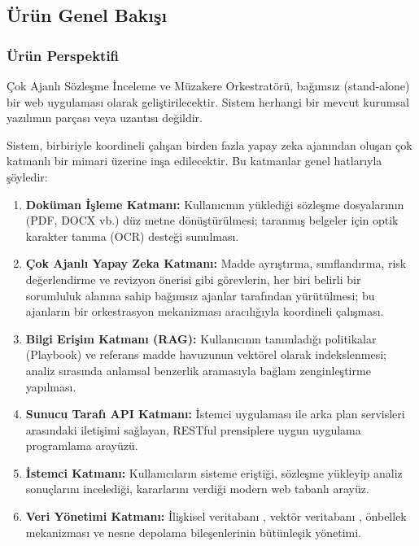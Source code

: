 \documentclass[12pt, a4paper]{article}
\begin{document}
\subsection{Ürün Genel Bakışı}

\subsubsection{Ürün Perspektifi}
Çok Ajanlı Sözleşme İnceleme ve Müzakere Orkestratörü, bağımsız (stand-alone) bir web uygulaması olarak geliştirilecektir. Sistem herhangi bir mevcut kurumsal yazılımın parçası veya uzantısı değildir.

Sistem, birbiriyle koordineli çalışan birden fazla yapay zeka ajanından oluşan çok katmanlı bir mimari üzerine inşa edilecektir. Bu katmanlar genel hatlarıyla şöyledir:

\begin{enumerate}[leftmargin=2cm]
    \item \textbf{Doküman İşleme Katmanı:} Kullanıcının yüklediği sözleşme dosyalarının (PDF, DOCX vb.) düz metne dönüştürülmesi; taranmış belgeler için optik karakter tanıma (OCR) desteği sunulması.
    \item \textbf{Çok Ajanlı Yapay Zeka Katmanı:} Madde ayrıştırma, sınıflandırma, risk değerlendirme ve revizyon önerisi gibi görevlerin, her biri belirli bir sorumluluk alanına sahip bağımsız ajanlar tarafından yürütülmesi; bu ajanların bir orkestrasyon mekanizması aracılığıyla koordineli çalışması.
    \item \textbf{Bilgi Erişim Katmanı (RAG):} Kullanıcının tanımladığı politikalar (Playbook) ve referans madde havuzunun vektörel olarak indekslenmesi; analiz sırasında anlamsal benzerlik aramasıyla bağlam zenginleştirme yapılması.
    \item \textbf{Sunucu Tarafı API Katmanı:} İstemci uygulaması ile arka plan servisleri arasındaki iletişimi sağlayan, RESTful prensiplere uygun uygulama programlama arayüzü.
    \item \textbf{İstemci Katmanı:} Kullanıcıların sisteme eriştiği, sözleşme yükleyip analiz sonuçlarını incelediği, kararlarını verdiği modern web tabanlı arayüz.
    \item \textbf{Veri Yönetimi Katmanı:} İlişkisel veritabanı , vektör veritabanı , önbellek mekanizması ve nesne depolama  bileşenlerinin bütünleşik yönetimi.
\end{enumerate}
\end{document}
